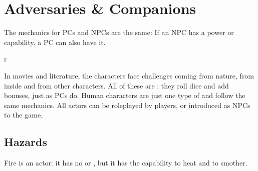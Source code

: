 \chapterspaceabove{6.75cm}
\chapterspacebelow{11.25cm}


\chapter*{Adversaries \& Companions}

\begin{emphasisParagraph}
	The mechanics for PCs and NPCs are the same: If an NPC has a power or capability,
	a PC can also have it.
\end{emphasisParagraph}


\begin{wrapfigure}{r}{}
\end{wrapfigure}


In movies and literature, the characters face challenges coming from nature, from inside and from other characters.
All of these are : they roll dice and add bonuses, just as PCs do.
Human characters are just one type of  and follow the same mechanics.
All actors can be roleplayed by players, or introduced as NPCs to the game.


\section*{Hazards}

Fire is an actor: it has no  or ,
but it has the capability to heat and to smother.




